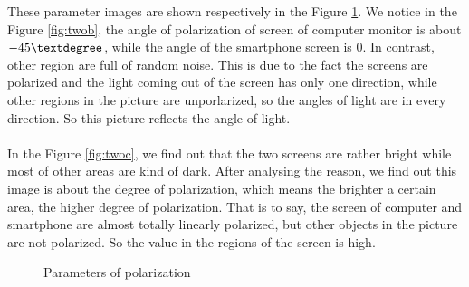 \documentclass[english]{article}
\begin{document}
These parameter images are shown respectively in the Figure \ref{fig:two}. We notice in the Figure \ref{fig:twob}, the angle of polarization of screen of computer monitor is about $-45\textdegree$, while the angle of the smartphone screen is 0\textdegree. In contrast, other region are full of random noise. This is due to the fact the screens are polarized and the light coming out of the screen has only one direction, while other regions in the picture are unporlarized, so the angles of light are in every direction. So this picture reflects the angle of light. \\
\\
In the Figure \ref{fig:twoc}, we find out that the two screens are rather bright while most of other areas are kind of dark. After analysing the reason, we find out this image is about the degree of polarization, which means the brighter a certain area, the higher degree of polarization. That is to say, the screen of computer and smartphone are almost totally linearly polarized, but other objects in the picture are not polarized. So the value in the regions of the screen is  high.

\begin{figure}[H]
	\centering
	\caption{Parameters of polarization}
	\label{fig:two}
\end{figure}
\end{document}
